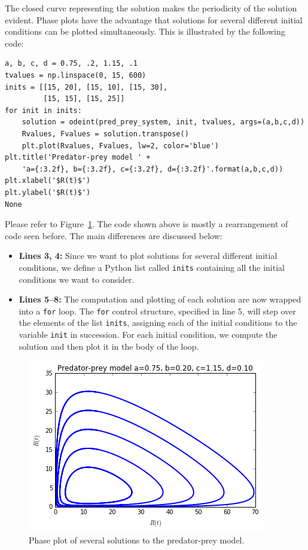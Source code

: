 The closed curve representing the solution makes the periodicity of the solution evident. Phase plots have the advantage that solutions for several different initial conditions can be plotted simultaneously. This is illustrated by the following code:
\begin{lstlisting}
a, b, c, d = 0.75, .2, 1.15, .1
tvalues = np.linspace(0, 15, 600)
inits = [[15, 20], [15, 10], [15, 30],
         [15, 15], [15, 25]]
for init in inits:
    solution = odeint(pred_prey_system, init, tvalues, args=(a,b,c,d))
    Rvalues, Fvalues = solution.transpose()
    plt.plot(Rvalues, Fvalues, lw=2, color='blue')
plt.title('Predator-prey model ' + 
    'a={:3.2f}, b={:3.2f}, c={:3.2f}, d={:3.2f}'.format(a,b,c,d))
plt.xlabel('$R(t)$')
plt.ylabel('$R(t)$')
None
\end{lstlisting}
Please refer to Figure~\ref{fig-predprey-phase2}. The code shown above is mostly a rearrangement of code seen before. The main differences are discussed below:
\begin{itemize}
\item \textbf{Lines 3, 4:} Since we want to plot solutions for several different initial conditions, we define a Python list called \texttt{inits} containing all the initial conditions we want to consider.
\item \textbf{Lines 5--8:} The computation and plotting of each solution are now wrapped into a \texttt{for} loop. The \texttt{for} control structure, specified in line 5, will step over the elements of the list \texttt{inits}, assigning each of the initial conditions to the variable \texttt{init} in succession. For each initial condition, we compute the solution and then plot it in the body of the loop.
\end{itemize}

\begin{figure}[h]
\caption{Phase plot of several solutions to the predator-prey model.}
\label{fig-predprey-phase2}
\begin{center}
\includegraphics[scale=0.6]{predprey-phase2}
\end{center}
\end{figure}

